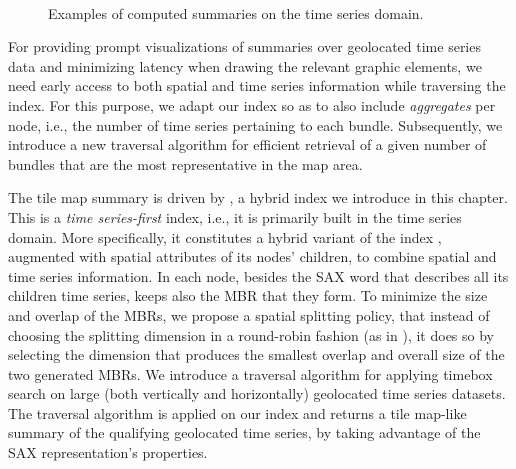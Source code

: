 \begin{figure}[!tb]
 \centering
 \
\caption{Examples of computed summaries on the time series domain.}
\label{fig:examples2}
\end{figure}

For providing prompt visualizations of summaries over geolocated time series data and minimizing latency when drawing the relevant graphic elements, we need early access to both spatial and time series information while traversing the index. For this purpose, we adapt our \btsr index so as to also include {\em aggregates} per node, i.e., the number of time series pertaining to each bundle. Subsequently, we introduce a new traversal algorithm for efficient retrieval of a given number of bundles that are the most representative in the map area. 

The tile map summary is driven by \hisax, a hybrid index we introduce in this chapter. This is a {\em time series-first} index, i.e., it is primarily built in the time series domain. More specifically, it constitutes a hybrid variant of the \isax index \cite{shieh2008kdd,camerra2010icdm,camerra2014kais}, augmented with spatial attributes of its nodes' children, to combine spatial and time series information. In each node, besides the SAX word that describes all its children time series, \hisax keeps also the MBR that they form. To minimize the size and overlap of the MBRs, we propose a spatial splitting policy, that instead of choosing the splitting dimension in a round-robin fashion (as in \isax), it does so by selecting the dimension that produces the smallest overlap and overall size of the two generated MBRs. We introduce a traversal algorithm for applying timebox search on large (both vertically and horizontally) geolocated time series datasets. The traversal algorithm is applied on our \hisax index and returns a tile map-like summary of the qualifying geolocated time series, by taking advantage of the SAX representation's properties.

